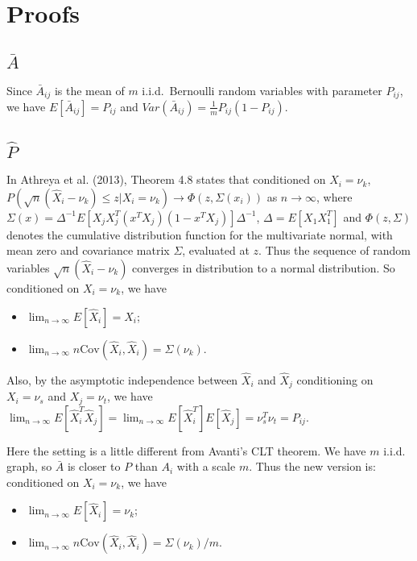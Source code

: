 \documentclass[a4paper]{article}
\begin{document}
\section{Proofs}

\subsection{$\bar{A}$}

Since $\bar{A}_{ij}$ is the mean of $m$ i.i.d.~Bernoulli random variables with parameter $P_{ij}$, we have $E[\bar{A}_{ij}] = P_{ij}$ and $Var(\bar{A}_{ij}) = \frac{1}{m} P_{ij} (1-P_{ij})$.



\subsection{$\hat{P}$}

In Athreya et al. (2013), Theorem 4.8 states that conditioned on $X_i = \nu_k$, 
$P \left( \sqrt{n} (\hat{X}_i - \nu_k) \le z | X_i = \nu_k \right) \rightarrow \Phi(z, \Sigma(x_i))$ as $n \rightarrow \infty$, where $\Sigma(x) = \Delta^{-1} E[X_j X_j^T (x^T X_j)(1 - x^T X_j)] \Delta^{-1}$, $\Delta = E[X_1 X_1^T]$ and $\Phi(z, \Sigma)$ denotes the cumulative distribution function for the multivariate normal, with mean zero and covariance matrix $\Sigma$, evaluated at $z$. Thus the sequence of random variables $\sqrt{n}(\hat{X}_i - \nu_k)$ converges in distribution to a normal distribution.
So conditioned on $X_i = \nu_k$, we have
\begin{itemize}
\item $\lim_{n\to\infty}E[\hat{X}_i] = X_i$;
\item $\lim_{n \rightarrow \infty} n \mathrm{Cov}(\hat{X}_i, \hat{X}_i) = \Sigma(\nu_k)$.
\end{itemize}

Also, by the asymptotic independence between $\hat{X}_i$ and $\hat{X}_j$ conditioning on $X_i = \nu_s$ and $X_j = \nu_t$, we have $\lim_{n\to\infty}E[\hat{X}_i^T \hat{X}_j] = \lim_{n\to\infty}E[\hat{X}_i^T] E[\hat{X}_j] = \nu_s^T \nu_t = P_{ij}$.


Here the setting is a little different from Avanti's CLT theorem. We have $m$ i.i.d. graph, so $\bar{A}$ is closer to $P$ than $A_i$ with a scale $m$. Thus the new version is: conditioned on $X_i = \nu_k$, we have
\begin{itemize}
\item $\lim_{n \rightarrow \infty} E[\hat{X}_i] = \nu_k$;
\item $\lim_{n \rightarrow \infty} n \mathrm{Cov}(\hat{X}_i, \hat{X}_i) = \Sigma(\nu_k)/m$.
\end{itemize}
\end{document}
